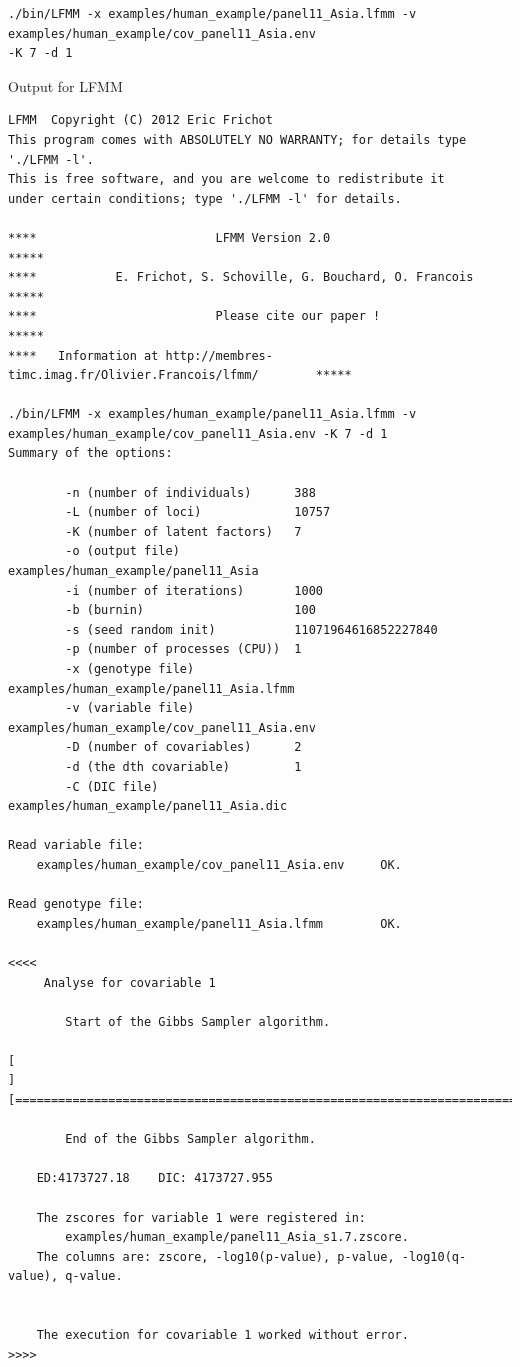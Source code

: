 \documentclass[10pt,a4paper]{article}
\begin{document}
\begin{Verbatim}[frame=single]
./bin/LFMM -x examples/human_example/panel11_Asia.lfmm -v examples/human_example/cov_panel11_Asia.env 
-K 7 -d 1 
\end{Verbatim}
Output for LFMM
\begin{Verbatim}[frame=single]
LFMM  Copyright (C) 2012 Eric Frichot
This program comes with ABSOLUTELY NO WARRANTY; for details type './LFMM -l'.
This is free software, and you are welcome to redistribute it
under certain conditions; type './LFMM -l' for details.

****                         LFMM Version 2.0                                   *****
****           E. Frichot, S. Schoville, G. Bouchard, O. Francois               *****
****                         Please cite our paper !                            *****
****   Information at http://membres-timc.imag.fr/Olivier.Francois/lfmm/        *****

./bin/LFMM -x examples/human_example/panel11_Asia.lfmm -v examples/human_example/cov_panel11_Asia.env -K 7 -d 1 
Summary of the options:

        -n (number of individuals)      388
        -L (number of loci)             10757
        -K (number of latent factors)   7
        -o (output file)                examples/human_example/panel11_Asia
        -i (number of iterations)       1000
        -b (burnin)                     100
        -s (seed random init)           11071964616852227840
        -p (number of processes (CPU))  1
        -x (genotype file)              examples/human_example/panel11_Asia.lfmm
        -v (variable file)              examples/human_example/cov_panel11_Asia.env
        -D (number of covariables)      2
        -d (the dth covariable)         1
        -C (DIC file)                   examples/human_example/panel11_Asia.dic

Read variable file:
 	examples/human_example/cov_panel11_Asia.env		OK.

Read genotype file:
 	examples/human_example/panel11_Asia.lfmm		OK.

<<<<
	 Analyse for covariable 1

		Start of the Gibbs Sampler algorithm.

[                                                                           ]
[===========================================================================]

		End of the Gibbs Sampler algorithm.

	ED:4173727.18	 DIC: 4173727.955 

	The zscores for variable 1 were registered in:
 		examples/human_example/panel11_Asia_s1.7.zscore.
	The columns are: zscore, -log10(p-value), p-value, -log10(q-value), q-value.


	The execution for covariable 1 worked without error.
>>>>
\end{Verbatim}
\end{document}
